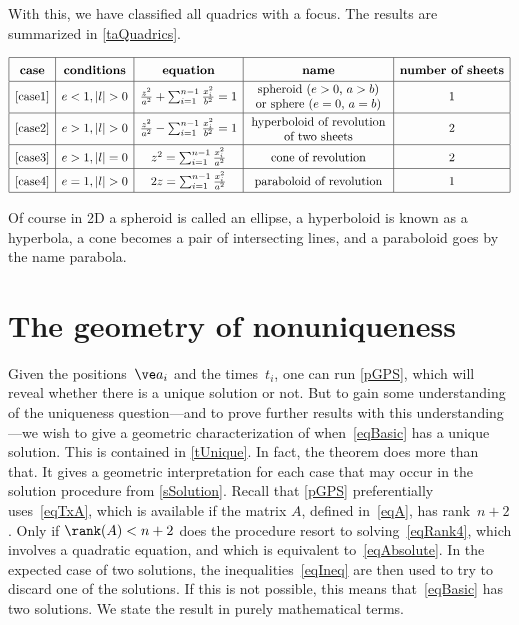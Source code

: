 \documentclass[reqno]{amsart}
\begin{document}
With this, we have classified all quadrics with a focus. The results
are summarized in \cref{taQuadrics}.

\begin{table}[ht]
\[
  \renewcommand{\arraystretch}{1.6}
  \begin{array}{|c|c|c|c|c|}
    \hline
    \text{\bf case} & \text{\bf conditions} & \text{\bf equation} &
    \text{\bf name} & \text{\bf number of sheets}
    \\
    \hline
    \ref{case1} & e < 1, |l| > 0 & \frac{z^2}{a^2} + \sum_{i=1}^{n-1}
    \frac{x_i^2}{b^2} = 1 & \parbox[c][9mm]{40mm}{\centering spheroid
    ($e > 0$, $a > b$) \\ or sphere ($e = 0$, $a = b$)} & 1 \\
    \hline
    \ref{case2} & e > 1, |l| > 0 & \frac{z^2}{a^2} - \sum_{i=1}^{n-1}
    \frac{x_i^2}{b^2} = 1 & \parbox[c][9mm]{40mm}{\centering
    hyperboloid of revolution of two sheets} & 2 \\
    \hline
    \ref{case3} & e > 1, |l| = 0 & z^2 = \sum_{i=1}^{n-1} \frac{x_i^2}{a^2} &
    \text{cone of revolution} & 2 \\
    \hline
    \ref{case4} & e = 1, |l| > 0 & 2 z = \sum_{i=1}^{n-1} \frac{x_i^2}{a^2} &
    \text{paraboloid of revolution} & 1
    \\
    \hline
  \end{array}
\]
\caption{Classification of quadrics with a focus in any dimension} \label{taQuadrics}
\end{table}

Of course in 2D a spheroid is called an ellipse, a hyperboloid is known as a hyperbola, a cone
becomes a pair of intersecting lines, and a paraboloid goes by the
name parabola.

\section{The geometry of nonuniqueness} \label{sGeometry}%

Given the positions~$\ve a_i$ and the times~$t_i$, one can run \cref{pGPS}, which will reveal whether
there is a unique solution or not. But to gain some understanding of
the uniqueness question---and to prove further results with this
understanding---we wish to give a geometric characterization of
when~\eqref{eqBasic} has a unique solution. This is contained in
\cref{tUnique}. In fact, the theorem
does more than that. It gives a geometric interpretation for each case
that may occur in the solution procedure from \cref{sSolution}. Recall
that \cref{pGPS} preferentially uses~\eqref{eqTxA}, which is
available if the matrix $A$, defined in~\eqref{eqA}, has
rank~$n+2$. Only if $\rank(A) < n + 2$ does the procedure resort to
solving~\eqref{eqRank4}, which involves a quadratic equation, and
which is equivalent to~\eqref{eqAbsolute}. In the expected case of two
solutions, the inequalities~\eqref{eqIneq} are then used to try to
discard one of the solutions. If this is not possible, this means
that~\eqref{eqBasic} has two solutions. We state the result in purely
mathematical terms.
\end{document}
